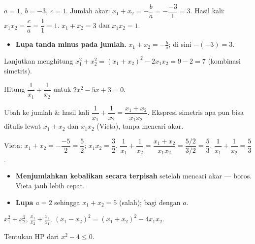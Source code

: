 \jawab
{} $a=1,\ b=-3,\ c=1$.
 Jumlah akar: $x_1+x_2=-\dfrac ba=-\dfrac{-3}{1}=3$.
 Hasil kali: $x_1x_2=\dfrac ca=\dfrac11=1$.
\jadi $x_1+x_2=3$ dan $x_1x_2=1$.

\begin{jebakan}
\begin{itemize}[leftmargin=*,topsep=2pt]
  \item \textbf{Lupa tanda minus pada jumlah.} $x_1+x_2=-\frac ba$; di sini
  $-(-3)=3$.
\end{itemize}
\end{jebakan}

\begin{variasi}
Lanjutkan menghitung $x_1^2+x_2^2=(x_1+x_2)^2-2x_1x_2=9-2=7$ (kombinasi simetris).
\end{variasi}

\begin{soalbox}{}
Hitung $\dfrac{1}{x_1}+\dfrac{1}{x_2}$ untuk $2x^2-5x+3=0$.
\end{soalbox}

\begin{ingat}{Ubah ke jumlah \& hasil kali}
$\dfrac{1}{x_1}+\dfrac{1}{x_2}=\dfrac{x_1+x_2}{x_1x_2}$. Ekspresi simetris apa pun
bisa ditulis lewat $x_1+x_2$ dan $x_1x_2$ (Vieta), tanpa mencari akar.
\end{ingat}

\jawab
{} Vieta: $x_1+x_2=-\dfrac{-5}{2}=\dfrac52$; $x_1x_2=\dfrac32$.
 $\dfrac{1}{x_1}+\dfrac{1}{x_2}=\dfrac{x_1+x_2}{x_1x_2}
=\dfrac{5/2}{3/2}=\dfrac53$.
\jadi $\dfrac{1}{x_1}+\dfrac{1}{x_2}=\dfrac53$.

\begin{jebakan}
\begin{itemize}[leftmargin=*,topsep=2pt]
  \item \textbf{Menjumlahkan kebalikan secara terpisah} setelah mencari akar ---
  boros. Vieta jauh lebih cepat.
  \item \textbf{Lupa $a=2$} sehingga $x_1+x_2=5$ (salah); bagi dengan $a$.
\end{itemize}
\end{jebakan}

\begin{variasi}
$x_1^2+x_2^2$, $\frac{x_1}{x_2}+\frac{x_2}{x_1}$, $(x_1-x_2)^2=(x_1+x_2)^2-4x_1x_2$.
\end{variasi}

\begin{soalbox}{}
Tentukan HP dari $x^2-4\le0$.
\end{soalbox}

